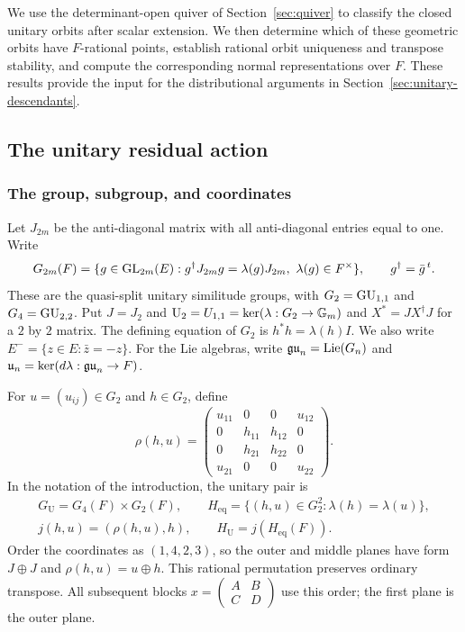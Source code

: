 We use the determinant-open quiver of Section~\ref{sec:quiver}
to classify the closed unitary orbits after scalar extension.
We then determine which of these geometric orbits have $F$-rational
points, establish rational orbit uniqueness and transpose stability,
and compute the corresponding normal representations over $F$.
These results provide the input for the distributional arguments in
Section~\ref{sec:unitary-descendants}.

\subsection{The unitary residual action}\label{m2:sec:reduction}

\subsubsection{The group, subgroup, and coordinates}\label{m2:red:pair}

Let $J_{2m}$ be the anti-diagonal matrix with all anti-diagonal
entries equal to one. Write
\[
 G_{2m}(F)=\{g\in\operatorname{GL}_{2m}(E):g^\dagger J_{2m}g
       =\lambda(g)J_{2m},\ \lambda(g)\in F^\times\},
 \qquad g^\dagger=\bar g^{\,t}.
\]
These are the quasi-split unitary similitude groups, with
$G_2=\operatorname{GU}_{1,1}$ and $G_4=\operatorname{GU}_{2,2}$. Put $J=J_2$ and
$\operatorname{U}_2=U_{1,1}=\ker(\lambda:G_2\to\mathbb G_m)$ and
$X^*=JX^\dagger J$ for a $2$ by $2$ matrix. The defining equation
of $G_2$ is $h^*h=\lambda(h)I$. We also write
$E^-=\{z\in E:\bar z=-z\}$.
For the Lie algebras, write $\mathfrak{gu}_n=\operatorname{Lie}(G_n)$ and
$\mathfrak u_n=\ker(d\lambda:\mathfrak{gu}_n\to F)$.

For $u=(u_{ij})\in G_2$ and $h\in G_2$, define
\[
 \rho(h,u)=\begin{pmatrix}
 u_{11}&0&0&u_{12}\\
 0&h_{11}&h_{12}&0\\
 0&h_{21}&h_{22}&0\\
 u_{21}&0&0&u_{22}
 \end{pmatrix}.
\]
In the notation of the introduction, the unitary pair is
\begin{equation}\label{m2:red:embedding}
 \begin{gathered}
 G_{\mathrm U}=G_4(F)\times G_2(F),\qquad
 H_{\mathrm{eq}}=\{(h,u)\in G_2^2:\lambda(h)=\lambda(u)\},\\
 j(h,u)=(\rho(h,u),h),\qquad H_{\mathrm U}=j(H_{\mathrm{eq}}(F)).
 \end{gathered}
\end{equation}
Order the coordinates as $(1,4,2,3)$, so the outer and middle
planes have form $J\oplus J$ and $\rho(h,u)=u\oplus h$.
This rational permutation preserves ordinary transpose. All subsequent
blocks $x=\left(\begin{smallmatrix}A&B\\C&D\end{smallmatrix}\right)$
use this order; the first plane is the outer plane.

